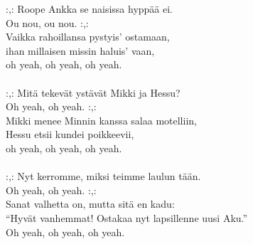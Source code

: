             :,: Roope Ankka se naisissa hyppää ei. \\
            Ou nou, ou nou. :,: \\
            Vaikka rahoillansa pystyis’ ostamaan, \\
            ihan millaisen missin haluis’ vaan, \\
            oh yeah, oh yeah, oh yeah. \\
\hspace{10mm} \\
            :,: Mitä tekevät ystävät Mikki ja Hessu? \\
            Oh yeah, oh yeah. :,: \\
            Mikki menee Minnin kanssa salaa motelliin, \\
            Hessu etsii kundei poikkeevii, \\
            oh yeah, oh yeah, oh yeah. \\
\hspace{10mm} \\
            :,: Nyt kerromme, miksi teimme laulun tään. \\
            Oh yeah, oh yeah. :,: \\
            Sanat valhetta on, mutta sitä en kadu: \\
            “Hyvät vanhemmat! Ostakaa nyt lapsillenne uusi Aku.” \\
            Oh yeah, oh yeah, oh yeah. \\
